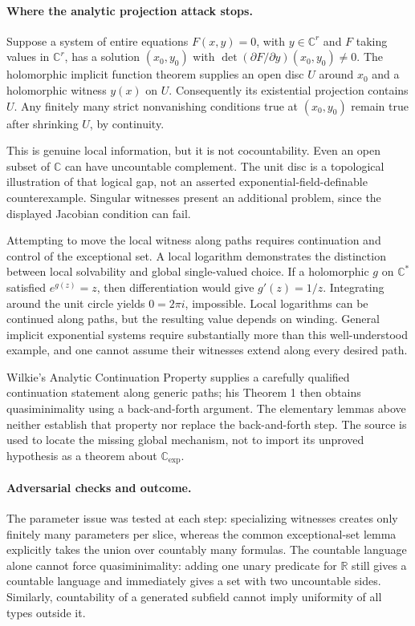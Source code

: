 \documentclass[11pt]{article}
\begin{document}
\paragraph{Where the analytic projection attack stops.}
Suppose a system of entire equations $F(x,y)=0$, with
$y\in\mathbb C^r$ and $F$ taking values in $\mathbb C^r$, has a solution
$(x_0,y_0)$ with $\det(\partial F/\partial y)(x_0,y_0)\ne0$.
The holomorphic implicit function theorem supplies an open disc $U$
around $x_0$ and a holomorphic witness $y(x)$ on $U$.
Consequently its existential projection contains $U$.
Any finitely many strict nonvanishing conditions true at $(x_0,y_0)$
remain true after shrinking $U$, by continuity.

This is genuine local information, but it is not cocountability. Even
an open subset of $\mathbb C$ can have uncountable complement. The unit
disc is a topological illustration of that logical gap, not an asserted
exponential-field-definable counterexample. Singular witnesses present
an additional problem, since the displayed Jacobian condition can fail.

Attempting to move the local witness along paths requires continuation
and control of the exceptional set. A local logarithm demonstrates the
distinction between local solvability and global single-valued choice.
If a holomorphic $g$ on $\mathbb C^*$ satisfied $e^{g(z)}=z$, then
differentiation would give $g'(z)=1/z$. Integrating around the unit
circle yields $0=2\pi i$, impossible. Local logarithms can be continued
along paths, but the resulting value depends on winding. General
implicit exponential systems require substantially more than this
well-understood example, and one cannot assume their witnesses extend
along every desired path.

Wilkie's Analytic Continuation Property supplies a carefully qualified
continuation statement along generic paths; his Theorem 1 then obtains
quasiminimality using a back-and-forth argument. The elementary lemmas
above neither establish that property nor replace the back-and-forth
step. The source is used to locate the missing global mechanism,
not to import its unproved hypothesis as a theorem about $\mathbb C_{\exp}$.

\paragraph{Adversarial checks and outcome.}
The parameter issue was tested at each step: specializing witnesses
creates only finitely many parameters per slice, whereas the common
exceptional-set lemma explicitly takes the union over countably many
formulas. The countable language alone cannot force quasiminimality:
adding one unary predicate for $\mathbb R$ still gives a countable
language and immediately gives a set with two uncountable sides.
Similarly, countability of a generated subfield cannot imply uniformity
of all types outside it.
\end{document}
